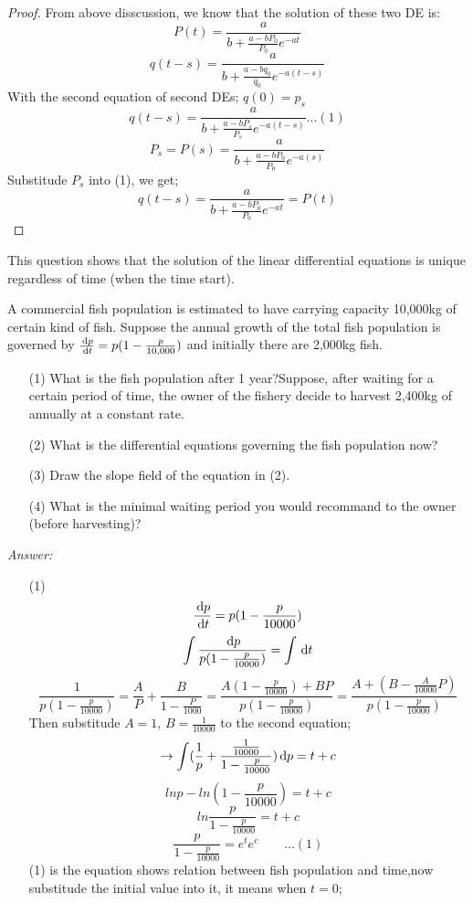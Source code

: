 \begin{proof}
From above disscussion, we know that the solution of these two DE is:
\[P(t)=\frac{a}{b+\frac{a-bP_0}{P_0}e^{-at}}
\]
\[q(t-s)=\frac{a}{b+\frac{a-bq_0}{q_0}e^{-a(t-s)}}
\]
With the second equation of second DEs; $q(0)=p_s$
\[q(t-s)=\frac{a}{b+\frac{a-bP_s}{P_s}e^{-a(t-s)}}\dots(1)
\]
\[P_s=P(s)=\frac{a}{b+\frac{a-bP_0}{P_0}e^{-a(s)}}
\]
Substitude $P_s$ into (1), we get;
\[q(t-s)=\frac{a}{b+\frac{a-bP_0}{P_0}e^{-at}}=P(t)
\]
\end{proof}
\begin{remark}
This question shows that the solution of the linear differential equations is unique regardless of time (when the time start).
\end{remark}


\begin{example}
A commercial fish population is estimated to have carrying capacity 10,000kg of certain kind of fish. Suppose the annual growth of the total fish population is governed by $\frac{\,\mathrm{d} p}{\,\mathrm{d} t}=p(1-\frac{p}{10,000})$ and initially there are 2,000kg fish.
\begin{enumerate}
\item[(1)]
What is the fish population after 1 year?Suppose, after waiting for a certain period of time, the owner of the fishery decide to harvest 2,400kg of annually at a constant rate.
\item[(2)]
What is the differential equations governing the fish population now?
\item[(3)]
Draw  the slope field of the equation in (2).
\item[(4)]
What is the minimal waiting period you would recommand to the owner (before harvesting)?
\end{enumerate}
\emph{Answer:}
\begin{enumerate}
\item[(1)]
\[\frac{\,\mathrm{d} p}{\,\mathrm{d} t}=p(1-\frac{p}{10000})
\]
\[\int\frac{\,\mathrm{d} p}{p(1-\frac{p}{10000})}=\int\,\mathrm{d} t
\]
\[\frac{1}{p(1-\frac{p}{10000})}=\frac{A}{P}+\frac{B}{1-\frac{P}{1000}}=\frac{A(1-\frac{p}{10000})+BP}{p(1-\frac{p}{10000})}=\frac{A+(B-\frac{A}{10000}P)}{p(1-\frac{p}{10000})}
\]
Then substitude $A=1$, $B=\frac{1}{10000}$ to the second equation;
\[\rightarrow\int(\frac{1}{p}+\frac{\frac{1}{10000}}{1-\frac{p}{10000}})\,\mathrm{d} p=t+c
\]
\[lnp-ln(1-\frac{p}{10000})=t+c
\]
\[ln\frac{p}{1-\frac{p}{10000}}=t+c
\]
\[\frac{p}{1-\frac{p}{10000}}=e^{t}e^c\qquad\dots(1)
\]
(1) is the equation shows relation between fish population and time,now substitude the initial value into  it, it means when $t=0$;

\end{enumerate}
\end{example}
